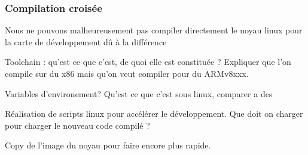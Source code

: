 \subsubsection{Compilation croisée}

Nous ne pouvons malheureusement pas compiler directement le noyau linux pour la carte de développement dû à la différence 


\vspace{10pt}


Toolchain : qu'est ce que c'est, de quoi elle est constituée ? Expliquer que l'on compile sur du x86 mais qu'on veut compiler pour du ARMv8xxx.

Variables d'environement? Qu'est ce que c'est sous linux, comparer a des 

Réalisation de scripts linux pour accélérer le développement. Que doit on charger pour charger le nouveau code compilé ?

Copy de l'image du noyau pour faire encore plus rapide.